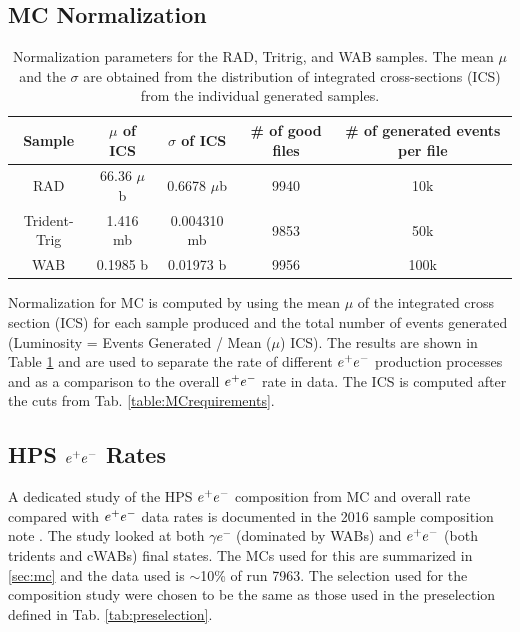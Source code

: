 \subsection{MC Normalization}


\begin{table}[!hb] 
\centering
\begin{tabular}{ccccc}
   \toprule    
    Sample & $\mu$ of ICS & $\sigma$ of ICS & \# of good files &  \# of generated events per file \\
    \midrule
     RAD & 66.36 $\mu$b & 0.6678 $\mu$b & 9940 & 10k \\
     Trident-Trig & 1.416 mb & 0.004310 mb & 9853 & 50k \\
     WAB & 0.1985 b & 0.01973 b & 9956 & 100k \\
     \bottomrule
\end{tabular}
\caption{Normalization parameters for the RAD, Tritrig, and WAB samples. The mean $\mu$ and the $\sigma$ are obtained from the distribution of integrated cross-sections (ICS) from the individual generated samples.}
\label{table:normalization}
\end{table}

Normalization for MC is computed by using the mean $\mu$ of the integrated cross section (ICS) for each sample produced %
and the total number of events generated (Luminosity = Events Generated / Mean ($\mu$) ICS). The results are shown in Table \ref{table:normalization} and are used to separate the rate of different $e^{+}e^{-}$ production processes and as a comparison to the overall $e^{+}e^{-}$ rate in data. The ICS is computed after the cuts from Tab. \ref{table:MCrequirements}.


\subsection{HPS $e^{+}e^{-}$ Rates}\label{sec:rates}
A dedicated study of the HPS $e^{+}e^{-}$ composition from MC and overall rate compared with $e^{+}e^{-}$ data rates is documented in the 2016 sample composition note \cite{tridentnote2016}. The study looked at both $\gamma e^-$ (dominated by WABs) and $e^{+}e^{-}$ (both tridents and cWABs) final states. The MCs used for this are summarized in \ref{sec:mc} and the data used is $\sim$10\% of run 7963. The selection used for the composition study were chosen to be the same as those used in the preselection defined in Tab. \ref{tab:preselection}.

